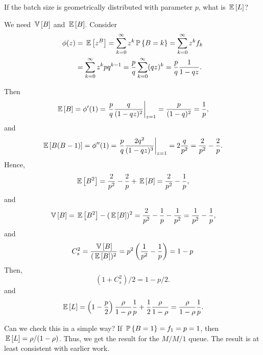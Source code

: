 \begin{question}
  If the batch size is geometrically distributed with parameter $p$, what is $\E L$?


\begin{solution}
  We need $\V B$ and $\E B$. Consider
  \begin{equation*}
    \begin{split}
    \phi(z) 
&= \E{z^B} = \sum_{k=0}^\infty z^k \P{B=k} = \sum_{k=0}^\infty z^k f_k \\
&= \sum_{k=0}^\infty z^k p q^{k-1} 
= \frac p q \sum_{k=0}^\infty (qz)^k = \frac pq \frac1{1-qz}.
    \end{split}
  \end{equation*}

Then
\begin{equation*}
  \E B = \phi'(1) = \left.\frac pq \frac q{(1-qz)^2}\right|_{z=1}= \frac p{(1-q)^2} = \frac 1 p,
\end{equation*}
and
\begin{equation*}
  \E{B(B-1)} = \phi''(1) = \left.\frac pq \frac{2q^2}{(1-qz)^3}\right|_{z=1}= 2 \frac{q}{p^2}= \frac2{p^2} - \frac 2p.
\end{equation*}
Hence, 
\begin{equation*}
  \E{B^2} = \frac2{p^2} - \frac 2p + \E B = \frac2{p^2} - \frac1p,
\end{equation*}
and
\begin{equation*}
  \V B = \E{B^2} - (\E B)^2 = \frac2{p^2} - \frac1p - \frac1{p^2} = \frac1{p^2}-\frac1p,
\end{equation*}
and
\begin{equation*}
  C_s^2= \frac{\V B}{(\E B)^2} = p^2 \left(\frac1{p^2}-\frac1p\right)=1-p
\end{equation*}
Then,
\begin{equation*}
  (1+C_s^2)/2= 1-p/2.
\end{equation*}
and 
\begin{equation*}
  \E L = 
\left(1-\frac p2\right) \frac\rho{1-\rho} \frac 1 p + \frac12\frac\rho{1-\rho}
=\frac\rho{1-\rho} \frac 1 p.
\end{equation*}

Can we check this in a simple way? If $\P{B=1}=f_1 = p =1$, then
$\E L=\rho/(1-\rho)$. Thus, we get the result for the $M/M/1$
queue. The result is at least consistent with earlier work.


\end{solution}


\end{question}

